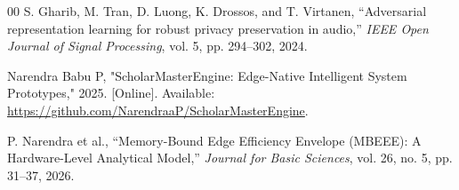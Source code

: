 \documentclass[conference]{IEEEtran}
\begin{document}
\begin{thebibliography}{00}
 S. Gharib, M. Tran, D. Luong, K. Drossos, and T. Virtanen, ``Adversarial representation learning for robust privacy preservation in audio,'' \textit{IEEE Open Journal of Signal Processing}, vol. 5, pp. 294--302, 2024.

Narendra Babu P, "ScholarMasterEngine: Edge-Native Intelligent System Prototypes," 2025. [Online]. Available: \url{https://github.com/NarendraaP/ScholarMasterEngine}.

 P. Narendra et al., ``Memory-Bound Edge Efficiency Envelope (MBEEE): A Hardware-Level Analytical Model,'' \textit{Journal for Basic Sciences}, vol. 26, no. 5, pp. 31--37, 2026.


\end{thebibliography}
\end{document}
